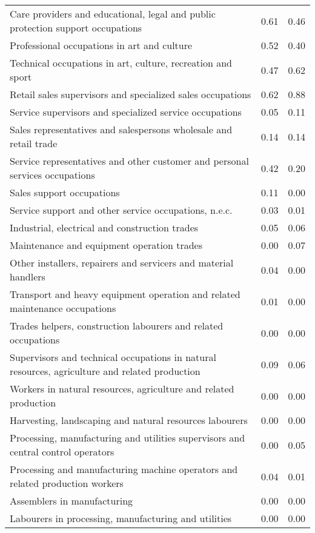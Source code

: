 \begin{table}[ht]
\begin{tabular}{lcc}
  Care providers and educational, legal and public protection support occupations & 0.61 & 0.46 \\ 
  Professional occupations in art and culture & 0.52 & 0.40 \\ 
  Technical occupations in art, culture, recreation and sport & 0.47 & 0.62 \\ 
  Retail sales supervisors and specialized sales occupations & 0.62 & 0.88 \\ 
  Service supervisors and specialized service occupations & 0.05 & 0.11 \\ 
  Sales representatives and salespersons  wholesale and retail trade & 0.14 & 0.14 \\ 
  Service representatives and other customer and personal services occupations & 0.42 & 0.20 \\ 
  Sales support occupations & 0.11 & 0.00 \\ 
  Service support and other service occupations, n.e.c. & 0.03 & 0.01 \\ 
  Industrial, electrical and construction trades & 0.05 & 0.06 \\ 
  Maintenance and equipment operation trades & 0.00 & 0.07 \\ 
  Other installers, repairers and servicers and material handlers & 0.04 & 0.00 \\ 
  Transport and heavy equipment operation and related maintenance occupations & 0.01 & 0.00 \\ 
  Trades helpers, construction labourers and related occupations & 0.00 & 0.00 \\ 
  Supervisors and technical occupations in natural resources, agriculture and related production & 0.09 & 0.06 \\ 
  Workers in natural resources, agriculture and related production & 0.00 & 0.00 \\ 
  Harvesting, landscaping and natural resources labourers & 0.00 & 0.00 \\ 
  Processing, manufacturing and utilities supervisors and central control operators & 0.00 & 0.05 \\ 
  Processing and manufacturing machine operators and related production workers & 0.04 & 0.01 \\ 
  Assemblers in manufacturing & 0.00 & 0.00 \\ 
  Labourers in processing, manufacturing and utilities & 0.00 & 0.00 \\ 
   \hline
\end{tabular}
\endgroup
\end{table}
